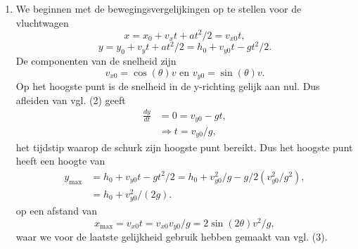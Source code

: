 \documentclass[a4paper,11pt]{article}
\begin{document}
\begin{enumerate}[label=(\alph*)]

    \item We beginnen met de bewegingsvergelijkingen op te stellen voor de vluchtwagen
    \begin{equation}
        x = x_0 + v_x t + a t^2 /2 = v_{x0} t,
    \end{equation}
    \begin{equation}
        y = y_0 + v_y t + a t^2 /2 = h_0 + v_{y0} t - gt^2/2.
    \end{equation}
    De componenten van de snelheid zijn
    \begin{equation}
        v_{x0} = \cos(\theta) v \text{ en } v_{y0} = \sin(\theta) v.
    \end{equation}
    Op het hoogste punt is de snelheid in de y-richting gelijk aan nul. Dus afleiden van vgl. (2) geeft
    \begin{equation}
        \begin{split}
            \frac{dy}{dt} &= 0 = v_{y0} - gt,\\
            &\Rightarrow t = v_{y0} / g,
        \end{split}
    \end{equation}
    het tijdstip waarop de schurk zijn hoogste punt bereikt. Dus het hoogste punt heeft een hoogte van 
    \begin{equation}
        \begin{split}
            y_{\text{max}} &= h_0 + v_{y0} t - gt^2/2 = h_0 + v_{y0}^2 / g - g/2 (v_{y0}^2 / g^2),\\
            & = h_0 + v_{y0}^2 / (2g).
        \end{split}
    \end{equation}
    op een afstand van 
    \begin{equation}
        x_{\text{max}} = v_{x0} t = v_{x0} v_{y0}/g = 2 \sin(2\theta)v^2/g,
    \end{equation}
    waar we voor de laatste gelijkheid gebruik hebben gemaakt van vgl. (3).


\end{enumerate}
\end{document}
